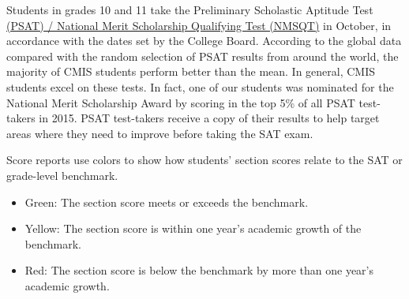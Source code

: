 Students in grades 10 and 11 take the Preliminary Scholastic Aptitude Test\href{https://drive.google.com/drive/folders/0B71\_pYxcTLo-VGNkQlZtTFlIQlE}{ (PSAT) / National Merit Scholarship Qualifying Test (NMSQT)} in October, in accordance with the dates set by the College Board. According to the global data compared with the random selection of PSAT results from around the world, the majority of CMIS students perform better than the mean. In general, CMIS students excel on these tests.  In fact, one of our students was nominated for the National Merit Scholarship Award by scoring in the top 5\% of all PSAT test-takers in 2015.  PSAT test-takers receive a copy of their results to help target areas where they need to improve before taking the SAT exam.  


Score reports use colors to show how students’ section scores relate to the SAT or grade-level benchmark.
\begin{itemize}
\item Green: The section score meets or exceeds the benchmark.
\item Yellow: The section score is within one year’s academic growth of the benchmark.
\item Red: The section score is below the benchmark by more than one year’s academic growth.
\end{itemize}






